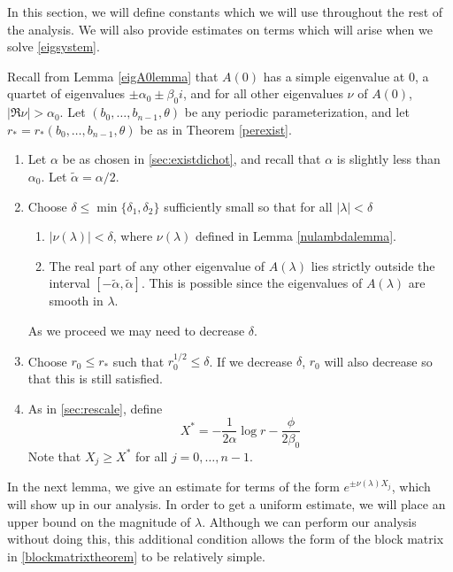 \documentclass[thesis.tex]{subfiles}
\begin{document}
In this section, we will define constants which we will use throughout the rest of the analysis. We will also provide estimates on terms which will arise when we solve \cref{eigsystem}.

Recall from Lemma \ref{eigA0lemma} that $A(0)$ has a simple eigenvalue at 0, a quartet of eigenvalues $\pm \alpha_0 \pm \beta_0 i$, and for all other eigenvalues $\nu$ of $A(0)$, $|\Re \nu| > \alpha_0$. Let $(b_0, \dots, b_{n-1}, \theta)$ be any periodic parameterization, and let $r_* = r_*(b_0, \dots, b_{n-1}, \theta)$ be as in Theorem \ref{perexist}. 

\begin{enumerate}
	\item Let $\alpha$ be as chosen in \cref{sec:existdichot}, and recall that $\alpha$	is slightly less than $\alpha_0$. Let $\tilde{\alpha} = \alpha/2$.

	\item Choose $\delta \leq \min\{\delta_1, \delta_2\}$ sufficiently small so that for all $|\lambda| < \delta$
	\begin{enumerate}
		\item $|\nu(\lambda)| < \delta$, where $\nu(\lambda)$ defined in Lemma \ref{nulambdalemma}.

		\item The real part of any other eigenvalue of $A(\lambda)$ lies strictly outside the interval $[-\tilde{\alpha}, \tilde{\alpha}]$. This is possible since the eigenvalues of $A(\lambda)$ are smooth in $\lambda$.
	\end{enumerate}
	As we proceed we may need to decrease $\delta$. 

	\item Choose $r_0 \leq r_*$ such that $r_0^{1/2} \leq \delta$. If we decrease $\delta$, $r_0$ will also decrease so that this is still satisfied.

	\item As in \cref{sec:rescale}, define
	\begin{equation}\label{Xstarstab}
	X^* = -\frac{1}{2\alpha}\log r - \frac{\phi}{2\beta_0}
	\end{equation}
	Note that $X_j \geq X^*$ for all $j = 0, \dots, n-1$.

\end{enumerate}

In the next lemma, we give an estimate for terms of the form $e^{\pm \nu(\lambda) X_j}$, which will show up in our analysis. In order to get a uniform estimate, we will place an upper bound on the  magnitude of $\lambda$. Although we can perform our analysis without doing this, this additional condition allows the form of the block matrix in \cref{blockmatrixtheorem} to be relatively simple. 
\end{document}
